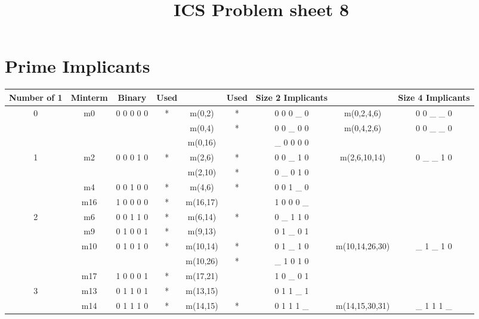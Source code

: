 \documentclass{article}
\begin{document}
    \title{ICS Problem sheet 8}
    \maketitle
    \section{\textbf{Prime Implicants}}
    \begin{center}
        \begin{tabular}{ | c | c | c | c | c | c | c | c | c | }
            \hline
            Number of 1 & Minterm & Binary & Used &  & Used & Size 2 Implicants &  & Size 4 Implicants \\
            \hline
            0 & m0 & 0 0 0 0 0 & * & m(0,2) & * & 0 0 0 \_ 0 & m(0,2,4,6) & 0 0 \_ \_ 0 \\
            \hline
            &  &  &  & m(0,4) & * & 0 0 \_ 0 0 & m(0,4,2,6) & 0 0 \_ \_ 0 \\
            \hline
            &  &  &  & m(0,16) &  & \_ 0 0 0 0 &  &  \\
            \hline
            1 & m2 & 0 0 0 1 0 & * & m(2,6) & * & 0 0 \_ 1 0 & m(2,6,10,14) & 0 \_ \_ 1 0 \\
            \hline
            &  &  &  & m(2,10) & * & 0 \_ 0 1 0 &  &  \\
            \hline
            & m4 & 0 0 1 0 0 & * & m(4,6) & * & 0 0 1 \_ 0 &  &  \\
            \hline
            & m16 & 1 0 0 0 0 & * & m(16,17) &  & 1 0 0 0 \_ &  &  \\
            \hline
            2 & m6 & 0 0 1 1 0 & * & m(6,14) & * & 0 \_ 1 1 0 &  &  \\
            \hline
            & m9 & 0 1 0 0 1 & * & m(9,13) &  & 0 1 \_ 0 1 &  &  \\
            \hline
            & m10 & 0 1 0 1 0 & * & m(10,14) & * & 0 1 \_ 1 0 & m(10,14,26,30)  & \_ 1 \_ 1 0 \\
            \hline
            &  &  &  & m(10,26) & * & \_ 1 0 1 0 &  &  \\
            \hline
            & m17 & 1 0 0 0 1 & * & m(17,21) &  & 1 0 \_ 0 1 &  &  \\
            \hline
            3 & m13 & 0 1 1 0 1 & * & m(13,15) &  & 0 1 1 \_ 1 &  &  \\
            \hline
            & m14 & 0 1 1 1 0 & * & m(14,15) & * & 0 1 1 1 \_ & m(14,15,30,31) & \_ 1 1 1 \_ \\

\end{tabular}
\end{center}
\end{document}
